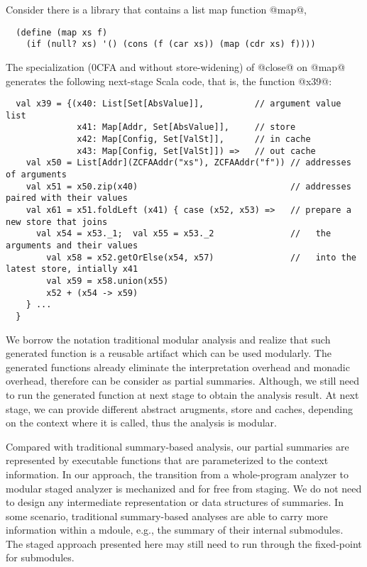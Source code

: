 Consider there is a library that contains a list map function @map@, 
\begin{lstlisting}
  (define (map xs f)
    (if (null? xs) '() (cons (f (car xs)) (map (cdr xs) f))))
\end{lstlisting}

The specialization (0CFA and without store-widening) of @close@ on
@map@ generates the following next-stage Scala code, that is, the
function @x39@:
\begin{lstlisting}
  val x39 = {(x40: List[Set[AbsValue]],          // argument value list
              x41: Map[Addr, Set[AbsValue]],     // store
              x42: Map[Config, Set[ValSt]],      // in cache
              x43: Map[Config, Set[ValSt]]) =>   // out cache
    val x50 = List[Addr](ZCFAAddr("xs"), ZCFAAddr("f")) // addresses of arguments
    val x51 = x50.zip(x40)                              // addresses paired with their values
    val x61 = x51.foldLeft (x41) { case (x52, x53) =>   // prepare a new store that joins
      val x54 = x53._1;  val x55 = x53._2               //   the arguments and their values
        val x58 = x52.getOrElse(x54, x57)               //   into the latest store, intially x41
        val x59 = x58.union(x55)
        x52 + (x54 -> x59)
    } ...
  }
\end{lstlisting}

We borrow the notation traditional modular analysis and realize that
such generated function is a reusable artifact which can be used
modularly.  The generated functions already eliminate the
interpretation overhead and monadic overhead, therefore can be
consider as partial summaries. Although, we still need to run the
generated function at next stage to obtain the analysis result.  At
next stage, we can provide different abstract arugments, store and
caches, depending on the context where it is called, thus the analysis
is modular.

Compared with traditional summary-based analysis, our partial
summaries are represented by executable functions that are
parameterized to the context information. In our approach, the
transition from a whole-program analyzer to modular staged analyzer is
mechanized and for free from staging. We do not need to design any
intermediate representation or data structures of summaries.  In some
scenario, traditional summary-based analyses are able to carry more
information within a mdoule, e.g., the summary of their internal
submodules. The staged approach presented here may still need to run
through the fixed-point for submodules.

